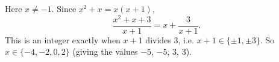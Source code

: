 Here $x\ne-1$. Since $x^2+x=x(x+1)$,
\[
\dfrac{x^2+x+3}{x+1}=x+\dfrac{3}{x+1}.
\]
This is an integer exactly when $x+1$ divides $3$, i.e. $x+1\in\{\pm1,\pm3\}$. So $\boxed{x\in\{-4,-2,0,2\}}$ (giving the values $-5$, $-5$, $3$, $3$).
